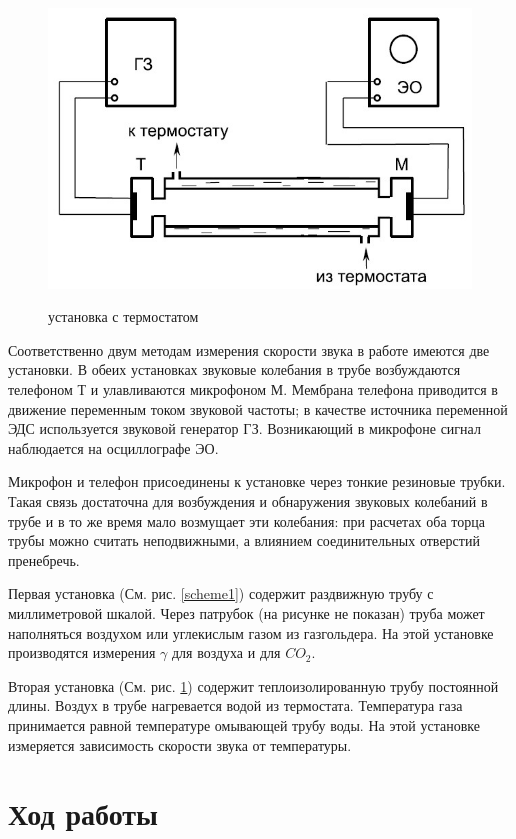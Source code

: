\documentclass[12pt,a4paper]{article}
\newcommand{\figref}[1]{(См. рис. \ref{#1})}
\begin{document}
	\begin{figure}[h]
		\caption{установка с термостатом}
		\includegraphics[scale=0.65]{res/scheme2.jpg}
		\label{scheme2}
	\end{figure}
	
	Соответственно двум методам измерения скорости звука в работе имеются две установки.
	В обеих установках звуковые колебания в трубе возбуждаются телефоном Т и улавливаются микрофоном М.
	Мембрана телефона приводится в движение переменным током звуковой частоты; в качестве источника переменной ЭДС используется звуковой генератор ГЗ.
	Возникающий в микрофоне сигнал наблюдается на осциллографе ЭО.
	
	Микрофон и телефон присоединены к установке через тонкие резиновые трубки.
	Такая связь достаточна для возбуждения и обнаружения звуковых колебаний в трубе и в то же время мало возмущает эти колебания: при расчетах оба торца трубы можно считать неподвижными, а влиянием соединительных отверстий пренебречь.
	
	Первая установка \figref{scheme1} содержит раздвижную трубу с миллиметровой шкалой.
	Через патрубок (на рисунке не показан) труба может наполняться воздухом или углекислым газом из газгольдера.
	На этой установке производятся измерения $\gamma$ для воздуха и для $CO_2$.
	
	Вторая установка \figref{scheme2} содержит теплоизолированную трубу постоянной длины.
	Воздух в трубе нагревается водой из термостата.
	Температура газа принимается равной температуре омывающей трубу воды.
	На этой установке измеряется зависимость скорости звука от температуры.

\section*{Ход работы}
\end{document}
